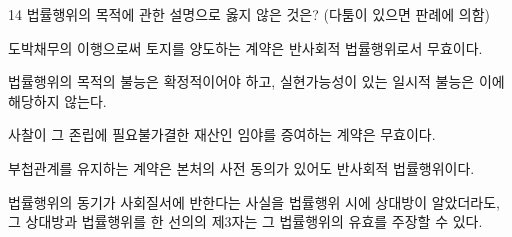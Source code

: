 \begin{question}{14}
법률행위의 목적에 관한 설명으로 옳지 않은 것은? (다툼이 있으면 판례에 의함)
\begin{choices}
  \item 도박채무의 이행으로써 토지를 양도하는 계약은 반사회적 법률행위로서 무효이다.
  \item 법률행위의 목적의 불능은 확정적이어야 하고, 실현가능성이 있는 일시적 불능은 이에 해당하지 않는다.
  \item 사찰이 그 존립에 필요불가결한 재산인 임야를 증여하는 계약은 무효이다.
  \item 부첩관계를 유지하는 계약은 본처의 사전 동의가 있어도 반사회적 법률행위이다.
  \item 법률행위의 동기가 사회질서에 반한다는 사실을 법률행위 시에 상대방이 알았더라도, 그 상대방과 법률행위를 한 선의의 제3자는 그 법률행위의 유효를 주장할 수 있다.
\end{choices}
\end{question}
